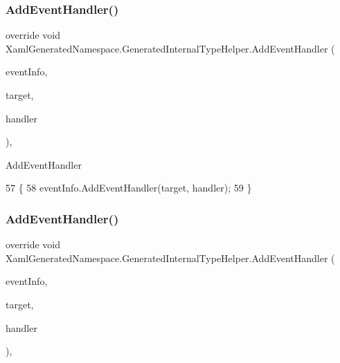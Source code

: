 \subsubsection{\texorpdfstring{Add\+Event\+Handler()}{AddEventHandler()}\hspace{0.1cm}{\footnotesize\ttfamily [2/3]}}
{\footnotesize\ttfamily override void Xaml\+Generated\+Namespace.\+Generated\+Internal\+Type\+Helper.\+Add\+Event\+Handler (\begin{DoxyParamCaption}\item[{System.\+Reflection.\+Event\+Info}]{event\+Info,  }\item[{object}]{target,  }\item[{System.\+Delegate}]{handler }\end{DoxyParamCaption})\hspace{0.3cm}{\ttfamily [inline]}, {\ttfamily [protected]}}



Add\+Event\+Handler 


\begin{DoxyCode}
57                                                                                                            
                          \{
58             eventInfo.AddEventHandler(target, handler);
59         \}
\end{DoxyCode}
\mbox{\label{classXamlGeneratedNamespace_1_1GeneratedInternalTypeHelper_a73471f4a6d1ca4c4fceec9ad8610f0c8}} 
\subsubsection{\texorpdfstring{Add\+Event\+Handler()}{AddEventHandler()}\hspace{0.1cm}{\footnotesize\ttfamily [3/3]}}
{\footnotesize\ttfamily override void Xaml\+Generated\+Namespace.\+Generated\+Internal\+Type\+Helper.\+Add\+Event\+Handler (\begin{DoxyParamCaption}\item[{System.\+Reflection.\+Event\+Info}]{event\+Info,  }\item[{object}]{target,  }\item[{System.\+Delegate}]{handler }\end{DoxyParamCaption})\hspace{0.3cm}{\ttfamily [inline]}, {\ttfamily [protected]}}



